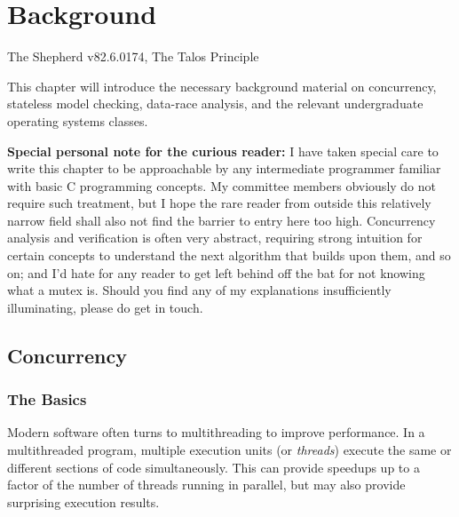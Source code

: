 \chapter{Background}
\label{chap:background}
{The Shepherd v82.6.0174, The Talos Principle}

This chapter will introduce the necessary background material on concurrency, stateless model checking, data-race analysis, and the relevant undergraduate operating systems classes.

{\bf Special personal note for the curious reader:} I have taken special care to write this chapter to be approachable by any intermediate programmer familiar with basic C programming concepts.
My committee members obviously do not require such treatment, but I hope the rare reader from outside this relatively narrow field shall also not find the barrier to entry here too high.
Concurrency analysis and verification is often very abstract,
requiring strong intuition for certain concepts to understand the next algorithm that builds upon them, and so on;
and I'd hate for any reader to get left behind off the bat for not knowing what a mutex is.
Should you find any of my explanations insufficiently illuminating, please do get in touch.

\section{Concurrency}

\subsection{The Basics}

Modern software often turns to multithreading to improve performance.
In a multithreaded program, multiple execution units (or {\em threads}) execute the same or different sections of code simultaneously.
This can provide speedups up to a factor of the number of threads running in parallel,
but may also provide surprising execution results.

